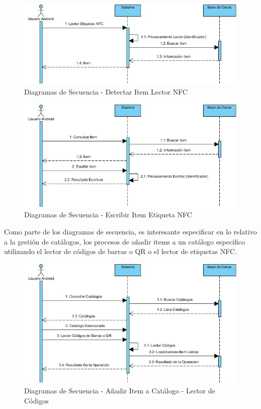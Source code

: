 \documentclass[a4paper,11pt]{book}
\begin{document}
\begin{figure}[H] 
\centering 
\includegraphics[scale=0.50]{imagenes/secuencia/android/detectar_item_nfc.jpg}
\caption{ Diagramas de Secuencia - Detectar Item Lector NFC\cite{diagrama}  }  
\end{figure}

\begin{figure}[H] 
\centering 
\includegraphics[scale=0.50]{imagenes/secuencia/android/escribir_nfc.jpg}
\caption{ Diagramas de Secuencia - Escribir Item Etiqueta NFC\cite{diagrama}  }  
\end{figure}

Como parte de los diagramas de secuencia, es interesante especificar en lo relativo a la gestión de catálogos, los procesos de añadir items a un catálogo específico utilizando el lector de códigos de barras o QR o el lector de etiquetas NFC.

\begin{figure}[H] 
\centering 
\includegraphics[scale=0.50]{imagenes/secuencia/android/add_item_barras.jpg}
\caption{ Diagramas de Secuencia - Añadir Item a Catálogo - Lector de Códigos\cite{diagrama}  }  
\end{figure}
\end{document}
